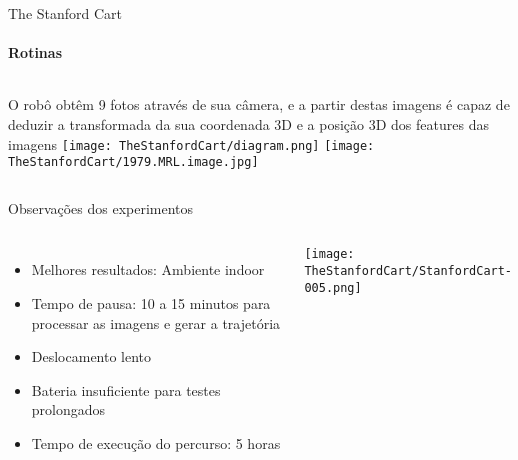 \begin{frame}[t]{The Stanford Cart}
    \framesubtitle{Rotinas}
    \begin{columns}
        O robô obtêm 9 fotos através de sua câmera, e a partir destas imagens é capaz de
        deduzir a transformada da sua coordenada 3D e a posição 3D dos features das imagens
        \vspace*{0.8cm}
        \texttt{[image: TheStanfordCart/diagram.png]}
        \vspace*{0.3cm}
            \texttt{[image: TheStanfordCart/1979.MRL.image.jpg]}
        \end{columns}
\end{frame}
\begin{frame}[c]{Observações dos experimentos}
    \begin{columns}
        \begin{itemize} 
            \item Melhores resultados: Ambiente indoor
            \item Tempo de pausa: 10 a 15 minutos para processar as imagens e gerar a trajetória
            \item Deslocamento lento
            \item Bateria insuficiente para testes prolongados
            \item Tempo de execução do percurso: 5 horas
        \end{itemize}
        \centering
            \texttt{[image: TheStanfordCart/StanfordCart-005.png]}
        \end{columns}
\end{frame}

